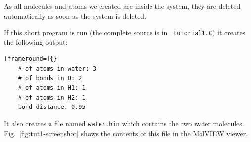 \noindent 
As all molecules and atoms we created are inside the system, they are deleted
automatically as soon as the system is deleted.

If this short program is run (the complete source is in {\tt
tutorial1.C}) it creates the following output:

\begin{lstlisting}[frameround=]{}
	# of atoms in water: 3
	# of bonds in O: 2
	# of atoms in H1: 1
	# of atoms in H2: 1
	bond distance: 0.95
\end{lstlisting}

\noindent
It also creates a file named {\tt water.hin} which contains the two water
molecules. Fig.~\ref{fig:tut1-screenshot} shows the contents of this file
in the MolVIEW viewer.
